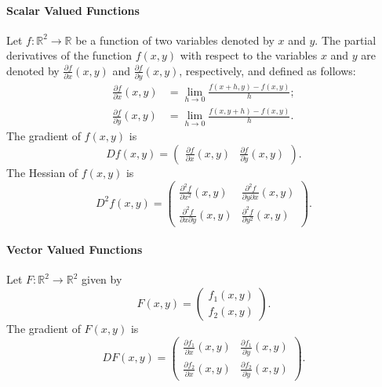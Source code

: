 \paragraph{Scalar Valued Functions}
Let $ f : \mathbb{R}^2 \rightarrow \mathbb{R} $ be a function of two variables
    denoted by $ x $ and $ y $.
The partial derivatives of the function $ f(x, y) $ with respect to the
    variables $ x $ and $ y $ are denoted by $ \frac{\partial f}{\partial x}
    (x, y) $ and $ \frac{\partial f}{\partial y} (x, y) $, respectively, and
    defined as follows:
\begin{align*}
    \frac{\partial f}{\partial x} (x, y) &= \lim_{h \rightarrow 0}
        \frac{f(x + h, y) - f(x, y)}{h}; \\
    \frac{\partial f}{\partial y} (x, y) &= \lim_{h \rightarrow 0}
        \frac{f(x, y + h) - f(x, y)}{h}.
\end{align*}
The gradient of $ f(x, y) $ is
\begin{equation}
    D f(x, y) =
    \begin{pmatrix}
        \frac{\partial f}{\partial x} (x, y) &
            \frac{\partial f}{\partial y} (x, y)
    \end{pmatrix}.
    \label{eq:definiton:two-variable-scalar-function-gradient}
\end{equation}
The Hessian of $ f(x, y) $ is
\begin{equation}
    D^2 f(x, y) =
    \begin{pmatrix}
        \frac{\partial^2 f}{\partial x^2} (x, y) &
            \frac{\partial^2 f}{\partial y \partial x} (x, y) \\
        \frac{\partial^2 f}{\partial x \partial y} (x, y) &
            \frac{\partial^2 f}{\partial y^2} (x, y)
    \end{pmatrix}.
    \label{eq:definition:two-variable-scalar-function-hessian}
\end{equation}

\paragraph{Vector Valued Functions}
Let $ F : \mathbb{R}^2 \rightarrow \mathbb{R}^2 $ given by
\begin{equation*}
    F(x, y) =
    \begin{pmatrix}
        f_1(x, y) \\
        f_2(x, y)
    \end{pmatrix}.
\end{equation*}
The gradient of $ F(x, y) $ is
\begin{equation}
    D F(x, y) =
    \begin{pmatrix}
        \frac{\partial f_1}{\partial x} (x, y) &
            \frac{\partial f_1}{\partial y} (x, y) \\
        \frac{\partial f_2}{\partial x} (x, y) &
            \frac{\partial f_2}{\partial y} (x, y)
    \end{pmatrix}.
    \label{eq:definition:two-variable-vector-function-gradient}
\end{equation}

